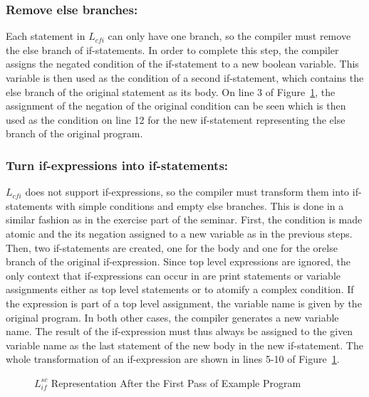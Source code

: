 \subsubsection{Remove else branches:}
Each statement in $L_{cfi}$ can only have one branch, so the compiler must remove the else branch of if-statements.
In order to complete this step, the compiler assigns the negated condition of the if-statement to a new boolean variable.
This variable is then used as the condition of a second if-statement, which contains the else branch of the original statement as its body.
On line 3 of Figure~\ref{code:sc}, the assignment of the negation of the original condition can be seen which is then used as the condition on line 12 for the new if-statement representing the else branch of the original program.

\subsubsection{Turn if-expressions into if-statements:}
$L_{cfi}$ does not support if-expressions, so the compiler must transform them into if-statements with simple conditions and empty else branches. This is done in a similar fashion as in the exercise part of the seminar.
First, the condition is made atomic and the its negation assigned to a new variable as in the previous steps.
Then, two if-statements are created, one for the body and one for the orelse branch of the original if-expression.
Since top level expressions are ignored, the only context that if-expressions can occur in are print statements or variable assignments either as top level statements or to atomify a complex condition.
If the expression is part of a top level assignment, the variable name is given by the original program. In both other cases, the compiler generates a new variable name.
The result of the if-expression must thus always be assigned to the given variable name as the last statement of the new body in the new if-statement.
The whole transformation of an if-expression are shown in lines 5-10 of Figure~\ref{code:sc}.

\begin{figure}[h]
	\centering
	
	\caption{$L_{if}^{sc}$ Representation After the First Pass of Example Program}
	\label{code:sc}
\end{figure}



